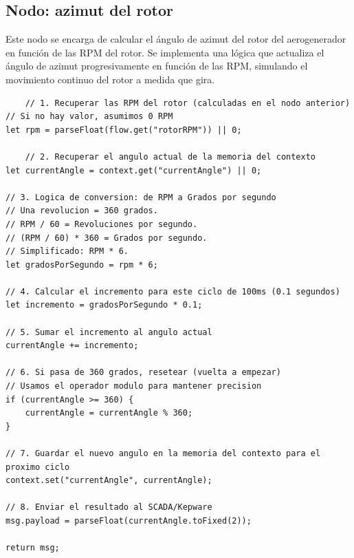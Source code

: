 \subsection{Nodo: azimut del rotor}
Este nodo se encarga de calcular el ángulo de azimut del rotor del aerogenerador en función de las RPM del rotor. Se implementa una lógica que actualiza el ángulo de azimut progresivamente en función de las RPM, simulando el movimiento continuo del rotor a medida que gira.
\begin{lstlisting}
    // 1. Recuperar las RPM del rotor (calculadas en el nodo anterior)
// Si no hay valor, asumimos 0 RPM
let rpm = parseFloat(flow.get("rotorRPM")) || 0;

    // 2. Recuperar el angulo actual de la memoria del contexto
let currentAngle = context.get("currentAngle") || 0;

// 3. Logica de conversion: de RPM a Grados por segundo
// Una revolucion = 360 grados.
// RPM / 60 = Revoluciones por segundo.
// (RPM / 60) * 360 = Grados por segundo.
// Simplificado: RPM * 6.
let gradosPorSegundo = rpm * 6;

// 4. Calcular el incremento para este ciclo de 100ms (0.1 segundos)
let incremento = gradosPorSegundo * 0.1;

// 5. Sumar el incremento al angulo actual
currentAngle += incremento;

// 6. Si pasa de 360 grados, resetear (vuelta a empezar)
// Usamos el operador modulo para mantener precision
if (currentAngle >= 360) {
    currentAngle = currentAngle % 360;
}

// 7. Guardar el nuevo angulo en la memoria del contexto para el proximo ciclo
context.set("currentAngle", currentAngle);

// 8. Enviar el resultado al SCADA/Kepware
msg.payload = parseFloat(currentAngle.toFixed(2));

return msg;
\end{lstlisting}
